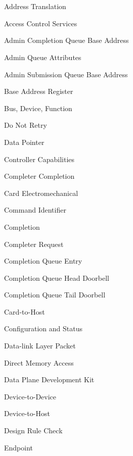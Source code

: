 \cleardoublepage
\chapter*{\listofabbrevname}
{}

\begin{acronym}[SQTDBLL]
    {Address Translation}

    {Access Control Services}

    {Admin Completion Queue Base Address}

    {Admin Queue Attributes}

    {Admin Submission Queue Base Address}

    {Base Address Register}

    {Bus, Device, Function}

    {Do Not Retry}

    {Data Pointer}

    {Controller Capabilities}

    {Completer Completion}

    {Card Electromechanical}

    {Command Identifier}

    {Completion}

    {Completer Request}

    {Completion Queue Entry}

    {Completion Queue Head Doorbell}

    {Completion Queue Tail Doorbell}

    {Card-to-Host}

    {Configuration and Status}

    {Data-link Layer Packet}

    {Direct Memory Access}

    {Data Plane Development Kit}

    {Device-to-Device}

    {Device-to-Host}

    {Design Rule Check}

    {Endpoint}


\end{acronym}

